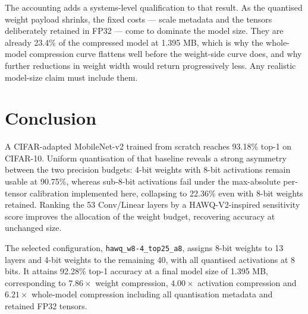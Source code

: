 \documentclass[10pt,a4paper]{article}
\begin{document}
The accounting adds a systems-level qualification to that result. As the
quantised weight payload shrinks, the fixed costs --- scale metadata and the
tensors deliberately retained in FP32 --- come to dominate the model size. They
are already 23.4\% of the compressed model at 1.395 MB, which is why the
whole-model compression curve flattens well before the weight-side curve does,
and why further reductions in weight width would return progressively less. Any
realistic model-size claim must include them.

\section{Conclusion}
A CIFAR-adapted MobileNet-v2 trained from scratch reaches 93.18\% top-1 on
CIFAR-10. Uniform quantisation of that baseline reveals a strong asymmetry
between the two precision budgets: 4-bit weights with 8-bit activations remain
usable at 90.75\%, whereas sub-8-bit activations fail under the max-absolute
per-tensor calibration implemented here, collapsing to 22.36\% even with 8-bit
weights retained. Ranking the 53 Conv/Linear layers by a HAWQ-V2-inspired
sensitivity score improves the allocation of the weight budget, recovering
accuracy at unchanged size.

The selected configuration, \texttt{hawq\_w8-4\_top25\_a8}, assigns 8-bit weights
to 13 layers and 4-bit weights to the remaining 40, with all quantised
activations at 8 bits. It attains 92.28\% top-1 accuracy at a final model size of
1.395 MB, corresponding to $7.86\times$ weight compression, $4.00\times$
activation compression and $6.21\times$ whole-model compression including all
quantisation metadata and retained FP32 tensors.

{\footnotesize

}
\end{document}
